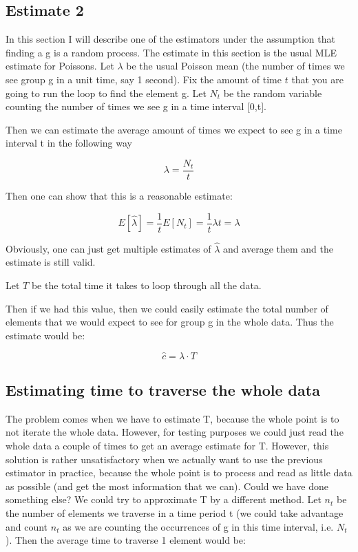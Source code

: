 \documentclass[a4paper]{article}
\begin{document}
\subsection{Estimate 2}

In this section I will describe one of the estimators under the assumption that finding a g is a random process.
The estimate in this section is the usual MLE estimate for Poissons.
Let $\lambda$ be the usual Poisson mean (the number of times we see group g in a unit time, say 1 second).
Fix the amount of time $t$ that you are going to run the loop to find the element g.
Let $N_t$ be the random variable counting the number of times we see g in a time interval [0,t].

Then we can estimate the average amount of times we expect to see g in a time interval t in the following way

$$ \lambda = \frac{N_t}{t}$$

Then one can show that this is a reasonable estimate:

$$E[\hat{\lambda}] =\frac{1}{t}E[N_t]=\frac{1}{t}\lambda t=\lambda$$

Obviously, one can just get multiple estimates of $\hat{\lambda}$ and average them and the estimate is still valid.

Let $T$ be the total time it takes to loop through all the data.

Then if we had this value, then we could easily estimate the total number of elements that we would expect to see for group g in the whole data. Thus the estimate would be:

$$\hat{c} = \lambda \cdot T$$


\subsection{Estimating time to traverse the whole data}

The problem comes when we have to estimate T, because the whole point is to not iterate the whole data.
However, for testing purposes we could just read the whole data a couple of times to get an average estimate for T.
However, this solution is rather unsatisfactory when we actually want to use the previous estimator in practice, because the whole point is to process and read as little data as possible (and get the most information that we can). 
Could we have done something else?
We could try to approximate T by a different method.
Let $n_t$ be the number of elements we traverse in a time period t (we could take advantage and count $n_t$ as we are counting the occurrences of g in this time interval, i.e. $N_t$).
Then the average time to traverse 1 element would be:
\end{document}
